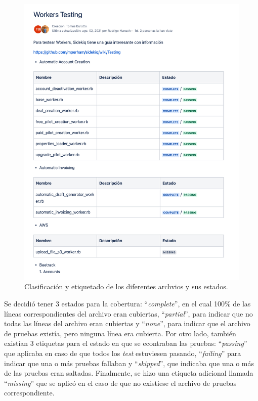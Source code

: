   \begin{figure}
    \centering
    \includegraphics[width=0.75\linewidth]{figures/testing/mapeo_tests_existentes.png}
    \caption{Clasificación y etiquetado de los diferentes archvios y sus estados.}
    \label{fig:mapeo_tests}
  \end{figure}

  Se decidió tener 3 estados para la cobertura: ``\textit{complete}'', en el cual 100\% de las líneas correspondientes del archivo eran cubiertas, ``\textit{partial}'', para indicar que no todas las líneas del archivo eran cubiertas y ``\textit{none}'', para indicar que el archivo de pruebas existía, pero ninguna línea era cubierta. Por otro lado, también existían 3 etiquetas para el estado en que se econtraban las pruebas: ``\textit{passing}'' que aplicaba en caso de que todos los \textit{test} estuviesen pasando, ``\textit{failing}'' para indicar que una o más pruebas fallaban y ``\textit{skipped}'', que indicaba que una o más de las pruebas eran saltadas. Finalmente, se hizo una etiqueta adicional llamada ``\textit{missing}'' que se aplicó en el caso de que no existiese el archivo de pruebas correspondiente.
  
